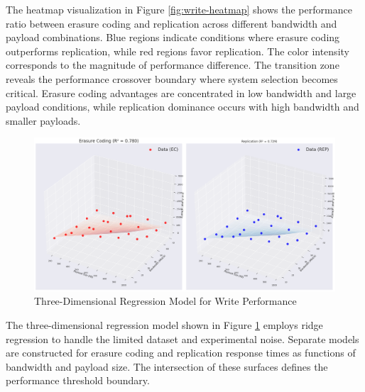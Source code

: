 The heatmap visualization in Figure \ref{fig:write-heatmap} shows the performance ratio between erasure coding and replication across different bandwidth and payload combinations. Blue regions indicate conditions where erasure coding outperforms replication, while red regions favor replication. The color intensity corresponds to the magnitude of performance difference. The transition zone reveals the performance crossover boundary where system selection becomes critical. Erasure coding advantages are concentrated in low bandwidth and large payload conditions, while replication dominance occurs with high bandwidth and smaller payloads.

\begin{figure}[ht]
\centering
\includegraphics[width=\columnwidth]{resources/chapter-4/write_bigload_avgnet_regression.png}
\caption{Three-Dimensional Regression Model for Write Performance}
\label{fig:write-regression}
\end{figure}

The three-dimensional regression model shown in Figure \ref{fig:write-regression} employs ridge regression to handle the limited dataset and experimental noise. Separate models are constructed for erasure coding and replication response times as functions of bandwidth and payload size. The intersection of these surfaces defines the performance threshold boundary.


